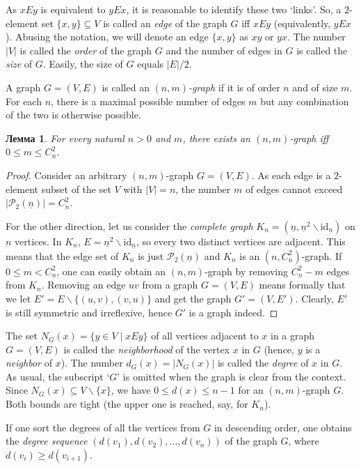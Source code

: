 \documentclass[12pt,notitlepage]{article}
\theoremstyle{plain}
\newtheorem{lemma}[thm]{Лемма}
\theoremstyle{definition}
\theoremstyle{plain}
\newcommand{\sbs}{\subseteq}
\renewcommand{\setminus}{\smallsetminus}
\newcommand{\mP}{\mathcal{P}}
\newcommand{\id}{\mathrm{id}}
\newcommand{\ul}[1]{\underline{#1}}
\newcommand{\1}{\mathbf{1}}
\newcommand{\0}{\mathbf{0}}
\begin{document}
As $x E y$ is equivalent to $y E x$, it is reasonable to identify these two `links'. So, a $2$-element set $\{x, y\} \sbs V$ is called an \emph{edge} of the graph $G$ iff $x E y$ (equivalently, $y E x$). Abusing the notation, we will denote an edge $\{x, y\}$ as $x y$ or $y x$. The number $|V|$ is called the \emph{order} of the graph $G$ and the number of edges in $G$ is called the \emph{size} of $G$. Easily, the size of $G$ equals $|E| / 2$.

A graph $G = (V, E)$ is called an \emph{$(n,m)$-graph} if it is of order $n$ and of size $m$. For each $n$, there is a maximal possible number of edges $m$ but any combination of the two is otherwise possible.
\begin{lemma}\label{L14:l_ord_size}
	For every natural $n > 0$ and $m$, there exists an $(n,m)$-graph iff $0 \leq m \leq C_n^2$.
\end{lemma}
\begin{proof}
	Consider an arbitrary $(n,m)$-graph $G = (V, E)$. As each edge is a $2$-element subset of the set $V$ with $|V| = n$, the number $m$ of edges cannot exceed $|\mP_2(\ul{n})| = C_n^2$.
	
	For the other direction, let us consider the \emph{complete graph} $K_n = (\ul{n}, \ul{n}^2 \setminus \id_{\ul{n}})$ on $n$ vertices. In $K_n$, $E = \ul{n}^2 \setminus \id_{\ul{n}}$, so every two distinct vertices are adjacent. This means that the edge set of $K_n$ is just $\mP_2(\ul{n})$ and $K_n$ is an $(n, C_n^2)$-graph. If $0 \leq m < C_n^2$, one can easily obtain an $(n, m)$-graph by removing $C_n^2 - m$ edges from $K_n$. Removing an edge $u v$ from a graph $G = (V, E)$ means formally that we let $E' = E \setminus \{(u, v), (v, u)\}$ and get the graph $G' = (V, E')$. Clearly, $E'$ is still symmetric and irreflexive, hence $G'$ is a graph indeed.
\end{proof}

The set $N_G(x) = \{ y \in V \mid x E y \}$ of all vertices adjacent to $x$ in a graph $G = (V, E)$ is called the \emph{neighborhood} of the vertex $x$ in $G$ (hence, $y$ is a \emph{neighbor} of $x$). The number $d_G(x) = |N_G(x)|$ is called the \emph{degree} of $x$ in $G$. As usual, the subscript `$G$' is omitted when the graph is clear from the context. Since $N_G(x)\sbs V \setminus \{ x \}$, we have $0 \leq d(x) \leq n - 1$ for an $(n, m)$-graph $G$. Both bounds are tight (the upper one is reached, say, for $K_n$).

If one sort the degrees of all the vertices from $G$ in descending order, one obtains the \emph{degree sequence} $(d(v_1), d(v_2), \ldots, d(v_n))$ of the graph $G$, where $d(v_i) \geq d(v_{i + 1})$.
\end{document}
